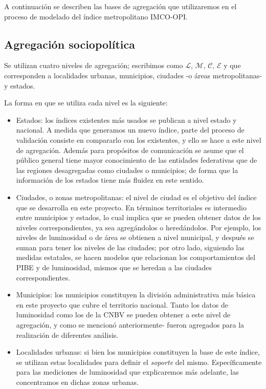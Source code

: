 \documentclass[]{article}
\begin{document}
A continuación se describen las bases de agregación que utilizaremos en
el proceso de modelado del índice metropolitano IMCO-OPI.

\subsection{Agregación sociopolítica}\label{agregacion-sociopolitica}

Se utilizan cuatro niveles de agregación; escribimos como
\(\mathcal{L},\, \mathcal{M},\, \mathcal{C},\, \mathcal{E}\) y que
corresponden a localidades urbanas, municipios, ciudades -o áreas
metropolitanas- y estados.

La forma en que se utiliza cada nivel es la siguiente:

\begin{itemize}
\item
  Estados: los índices existentes más usados se publican a nivel estado
  y nacional. A medida que generamos un nuevo índice, parte del proceso
  de validación consiste en compararlo con los existentes, y ello se
  hace a este nivel de agregación. Además para propósitos de
  comunicación se asume que el público general tiene mayor conocimiento
  de las entidades federativas que de las regiones desagregadas como
  ciudades o municipios; de forma que la información de los estados
  tiene más fluidez en este sentido.
\item
  Ciudades, o zonas metropolitanas: el nivel de ciudad es el objetivo
  del índice que se desarrolla en este proyecto. En términos
  territoriales es intermedio entre municipios y estados, lo cual
  implica que se pueden obtener datos de los niveles correspondientes,
  ya sea agregándolos o heredándolos. Por ejemplo, los niveles de
  luminosidad o de área se obtienen a nivel municipal, y después se
  suman para tener los niveles de las ciudades; por otro lado, siguiendo
  las medidas estatales, se hacen modelos que relacionan los
  comportamientos del PIBE y de luminosidad, mismos que se heredan a las
  ciudades correspondientes.
\item
  Municipios: los municipios constituyen la división administrativa más
  básica en este proyecto que cubre el territorio nacional. Tanto los
  datos de luminosidad como los de la CNBV se pueden obtener a este
  nivel de agregación, y como se mencionó anteriormente- fueron
  agregados para la realización de diferentes análisis.
\item
  Localidades urbanas: si bien los municipios constituyen la base de
  este índice, se utilizan estas localidades para definir el
  \emph{soporte} del mismo. Específicamente para las mediciones de
  luminosidad que explicaremos más adelante, las concentramos en dichas
  zonas urbanas.
\end{itemize}
\end{document}
